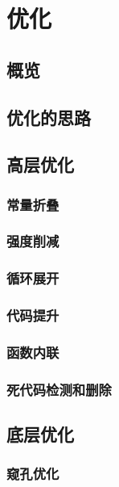 \documentclass[cn,11pt,chinese]{elegantbook}
\begin{document}
\chapter{优化}

\section{概览}

\section{优化的思路}

\section{高层优化}

\subsection{常量折叠}

\subsection{强度削减}

\subsection{循环展开}

\subsection{代码提升}

\subsection{函数内联}

\subsection{死代码检测和删除}

\section{底层优化}

\subsection{窥孔优化}
\end{document}
